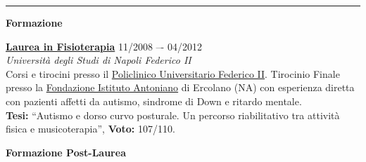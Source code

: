 \documentclass[a4paper]{article}
\newcommand{\block}[1]{\hrule \vspace{0.2cm} \textbf{\Large #1} \vspace{0.2cm}}
\newcommand{\blockNp}[1]{\newpage \textbf{\Large #1} \vspace{0.2cm}}
\newcommand{\voice}[5]{\href{#4}{\textbf{#1}} \hfill #2 \\ \textit{#3} \\ {\small #5} \vspace{0.2cm} \\}
\begin{document}

    \block{Formazione}

    \voice{Laurea in Fisioterapia}
    {11/2008 –- 04/2012}
    {Università degli Studi di Napoli Federico II%
    }
    {https://m78.corsidistudio.unina.it/}
    {
    Corsi e tirocini presso il \href{https://www.policlinico.unina.it/flex/cm/pages/ServeBLOB.php/L/IT/IDPagina/1}{Policlinico Universitario Federico II}.
    Tirocinio Finale presso la \href{https://www.istitutoantoniano.it/}{Fondazione Istituto Antoniano} di Ercolano (NA) con esperienza diretta con pazienti affetti da autismo, sindrome di Down e ritardo mentale.\\
    \textbf{Tesi:} “Autismo e dorso curvo posturale. Un percorso riabilitativo tra attività fisica e musicoterapia”,  \textbf{Voto:} 107/110.
    \vspace{-0.25cm}
    }

    \clearpage

    \blockNp{Formazione Post-Laurea}
\end{document}
